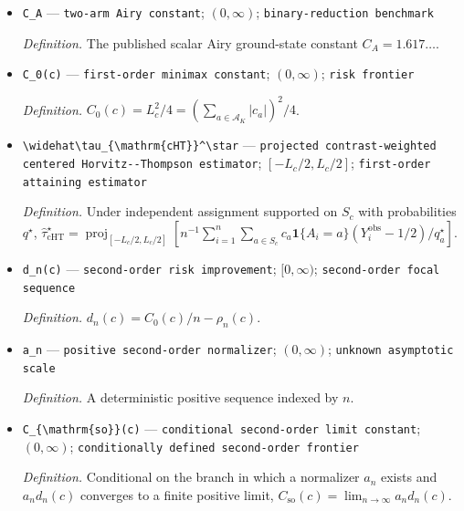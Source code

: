 \documentclass{article}
\begin{document}
\begin{itemize}
  \item \texttt{C\_\allowbreak{}A} --- \texttt{two-\allowbreak{}arm Airy constant}; \((0,\infty)\); \texttt{binary-\allowbreak{}reduction benchmark}
  \par\smallskip\noindent\emph{Definition.} The published scalar Airy ground-state constant \(C_A=1.617\ldots\).
  \item \texttt{C\_\allowbreak{}0(c)} --- \texttt{first-\allowbreak{}order minimax constant}; \((0,\infty)\); \texttt{risk frontier}
  \par\smallskip\noindent\emph{Definition.} \(C_0(c)=L_c^2/4=(\sum_{a\in\mathcal A_K}|c_a|)^2/4\).
  \item \texttt{\textbackslash{}\allowbreak{}widehat\textbackslash{}\allowbreak{}tau\_\allowbreak{}\{\textbackslash{}\allowbreak{}mathrm\{cHT\}\allowbreak{}\}\allowbreak{}\textasciicircum{}\textbackslash{}\allowbreak{}star} --- \texttt{projected contrast-\allowbreak{}weighted centered Horvitz-\allowbreak{}-\allowbreak{}Thompson estimator}; \([-L_c/2,L_c/2]\); \texttt{first-\allowbreak{}order attaining estimator}
  \par\smallskip\noindent\emph{Definition.} Under independent assignment supported on \(S_c\) with probabilities \(q^\star\), \(\widehat\tau_{\mathrm{cHT}}^\star=\operatorname{proj}_{[-L_c/2,L_c/2]}\!\left[n^{-1}\sum_{i=1}^n\sum_{a\in S_c}c_a\mathbf 1\{A_i=a\}(Y_i^{\mathrm{obs}}-1/2)/q_a^\star\right]\).
  \item \texttt{d\_\allowbreak{}n(c)} --- \texttt{second-\allowbreak{}order risk improvement}; \([0,\infty)\); \texttt{second-\allowbreak{}order focal sequence}
  \par\smallskip\noindent\emph{Definition.} \(d_n(c)=C_0(c)/n-\rho_n(c)\).
  \item \texttt{a\_\allowbreak{}n} --- \texttt{positive second-\allowbreak{}order normalizer}; \((0,\infty)\); \texttt{unknown asymptotic scale}
  \par\smallskip\noindent\emph{Definition.} A deterministic positive sequence indexed by \(n\).
  \item \texttt{C\_\allowbreak{}\{\textbackslash{}\allowbreak{}mathrm\{so\}\allowbreak{}\}\allowbreak{}(c)} --- \texttt{conditional second-\allowbreak{}order limit constant}; \((0,\infty)\); \texttt{conditionally defined second-\allowbreak{}order frontier}
  \par\smallskip\noindent\emph{Definition.} Conditional on the branch in which a normalizer \(a_n\) exists and \(a_nd_n(c)\) converges to a finite positive limit, \(C_{\mathrm{so}}(c)=\lim_{n\to\infty}a_nd_n(c)\).

\end{itemize}
\end{document}
